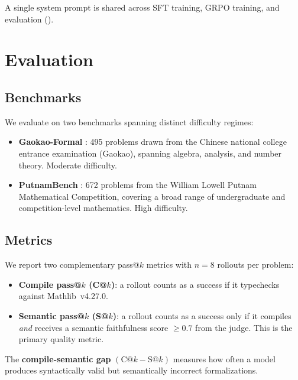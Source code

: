 \documentclass[11pt,a4paper]{article}
\begin{document}
A single system prompt is shared across SFT training, GRPO training, and evaluation ().

\section{Evaluation}\label{sec:eval}

\subsection{Benchmarks}\label{sec:benchmarks}

We evaluate on two benchmarks spanning distinct difficulty regimes:
\begin{itemize}[leftmargin=*, itemsep=2pt]
  \item \textbf{Gaokao-Formal} \citep{zhang2024gaokao}: 495 problems drawn from the Chinese national college entrance examination (Gaokao), spanning algebra, analysis, and number theory. Moderate difficulty.
  \item \textbf{PutnamBench} \citep{tsoukalas2024putnambench}: 672 problems from the William Lowell Putnam Mathematical Competition, covering a broad range of undergraduate and competition-level mathematics. High difficulty.
\end{itemize}

\subsection{Metrics}\label{sec:metrics_def}

We report two complementary pass@$k$ metrics with $n{=}8$ rollouts per problem:

\begin{itemize}[leftmargin=*, itemsep=2pt]
  \item \textbf{Compile pass@$k$ (C@$k$)}: a rollout counts as a success if it typechecks against Mathlib~v4.27.0.
  \item \textbf{Semantic pass@$k$ (S@$k$)}: a rollout counts as a success only if it compiles \emph{and} receives a semantic faithfulness score $\geq 0.7$ from the judge. This is the primary quality metric.
\end{itemize}

The \textbf{compile-semantic gap} $(\text{C@}k - \text{S@}k)$ measures how often a model produces syntactically valid but semantically incorrect formalizations.
\end{document}
